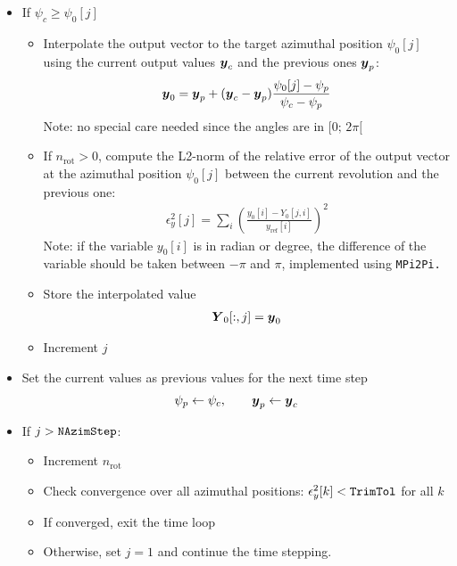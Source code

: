 \documentclass[11pt]{article}
\begin{document}
\begin{itemize}
\begin{itemize}
            \item If $\psi_c \geq \psi_0[j]$ 
                \begin{itemize}
                    \item Interpolate the output vector to the target azimuthal position $\psi_0[j]$ using the current output values $\v{y}_c$ and the previous ones $\v{y}_p$:
                        \begin{align}
                     \v{y}_0 = \v{y}_p + (\v{y}_c-\v{y}_p)\frac{\psi_0[j]-\psi_p}{\psi_c-\psi_p}   %
                        \end{align}
                        Note: no special care needed since the angles are in $[0;\, 2\pi[$
                    \item If $n_\text{rot}>0$, compute the L2-norm of the relative error of the output vector at the azimuthal position $\psi_0[j]$ between the current revolution and the previous one:
                        \begin{align}
                            \epsilon_y^2[j] %
                            = \sum_i \left(\frac{y_0[i]-Y_0[j,i]}{y_\text{ref}[i]}  \right)^2
                        \end{align}
                        Note: if the variable $y_0[i]$ is in radian or degree, the difference of the variable should be taken between $-\pi$ and $\pi$, implemented using \tt{MPi2Pi}. 
                    \item Store the interpolated value
                        \begin{align}
                            \m{Y}_0[:,j] = \v{y}_0
                        \end{align}
                    \item Increment $j$%
                \end{itemize}

            \item Set the current values as previous values for the next time step
                \begin{align}
                   \psi_p \leftarrow \psi_c
                   ,\qquad
                   \v{y}_p \leftarrow \v{y}_c
                \end{align}

            \item If $j>\tt{NAzimStep}$: 
                    \begin{itemize}
                        \item Increment $n_\text{rot}$
                        \item Check convergence over all azimuthal positions: $\epsilon^2_y[k]<\tt{TrimTol}$ for all $k$
                        \item If converged, exit the time loop
                        \item Otherwise, set $j=1$ and continue the time stepping.
            \end{itemize}


\end{itemize}
\end{itemize}
\end{document}
